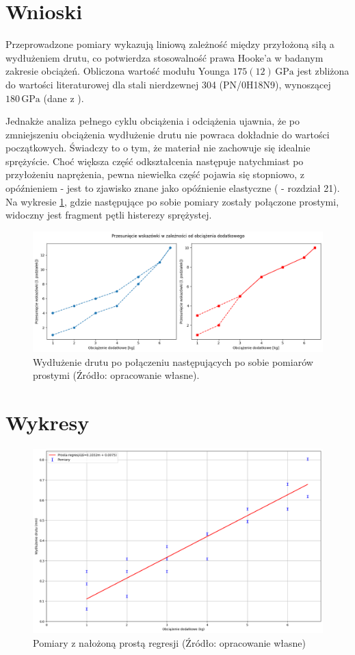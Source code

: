 \documentclass[a4paper,12pt]{article}
\begin{document}
\section{Wnioski}

Przeprowadzone pomiary wykazują liniową zależność między przyłożoną siłą a wydłużeniem drutu, co potwierdza stosowalność prawa Hooke'a w badanym zakresie obciążeń. Obliczona wartość modułu Younga \( 175(12)\,\text{GPa} \) jest zbliżona do wartości literaturowej dla stali nierdzewnej 304 (PN/0H18N9), wynoszącej \( 180\,\text{GPa} \) (dane z \cite{calculla}).

Jednakże analiza pełnego cyklu obciążenia i odciążenia ujawnia, że po zmniejszeniu obciążenia wydłużenie drutu nie powraca dokładnie do wartości początkowych. Świadczy to o tym, że materiał nie zachowuje się idealnie sprężyście. Choć większa część odkształcenia następuje natychmiast po przyłożeniu naprężenia, pewna niewielka część pojawia się stopniowo, z opóźnieniem - jest to zjawisko znane jako opóźnienie elastyczne (\cite{Drynski1976} - rozdział 21). Na wykresie \ref{fig:histereza}, gdzie następujące po sobie pomiary zostały połączone prostymi, widoczny jest fragment pętli histerezy sprężystej.

\begin{figure}[H]
    \centering
    \includegraphics[width=1\linewidth]{histereza.png}
    \caption{Wydłużenie drutu po połączeniu następujących po sobie pomiarów prostymi (Źródło: opracowanie własne).}
    \label{fig:histereza}
\end{figure}

\section{Wykresy}

\begin{figure}[H]
    \centering
    \includegraphics[width=1.2\linewidth,angle=90]{prosta_regresji.png}
    \caption{Pomiary z nałożoną prostą regresji (Źródło: opracowanie własne)}
    \label{fig:prosta_regresji}
\end{figure}


\newpage


\end{document}
